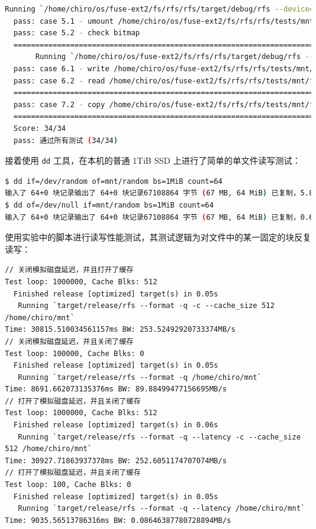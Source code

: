 \begin{lstlisting}[language=bash]
       Running `/home/chiro/os/fuse-ext2/fs/rfs/rfs/target/debug/rfs --device=/home/chiro/ddriver -q /home/chiro/os/fuse-ext2/fs/rfs/rfs/tests/mnt`
  pass: case 5.1 - umount /home/chiro/os/fuse-ext2/fs/rfs/rfs/tests/mnt
  pass: case 5.2 - check bitmap
  ============================================================================================================================    Finished dev [unoptimized + debuginfo] target(s) in 0.06s
       Running `/home/chiro/os/fuse-ext2/fs/rfs/rfs/target/debug/rfs --device=/home/chiro/ddriver -q /home/chiro/os/fuse-ext2/fs/rfs/rfs/tests/mnt`
  pass: case 6.1 - write /home/chiro/os/fuse-ext2/fs/rfs/rfs/tests/mnt/file0
  pass: case 6.2 - read /home/chiro/os/fuse-ext2/fs/rfs/rfs/tests/mnt/file0
  ============================================================================================================================pass: case 7.1 - prepare content of /home/chiro/os/fuse-ext2/fs/rfs/rfs/tests/mnt/file9
  pass: case 7.2 - copy /home/chiro/os/fuse-ext2/fs/rfs/rfs/tests/mnt/file9 to /home/chiro/os/fuse-ext2/fs/rfs/rfs/tests/mnt/file10
  ============================================================================================================================ 
  Score: 34/34
  pass: 通过所有测试 (34/34)
\end{lstlisting}

接着使用 \verb|dd| 工具，在本机的普通 1TiB SSD 上进行了简单的单文件读写测试：

\begin{lstlisting}[language=bash]
$ dd if=/dev/random of=mnt/random bs=1MiB count=64
输入了 64+0 块记录输出了 64+0 块记录67108864 字节 (67 MB, 64 MiB) 已复制，5.88972 s，11.4 MB/s
$ dd of=/dev/null if=mnt/random bs=1MiB count=64
输入了 64+0 块记录输出了 64+0 块记录67108864 字节 (67 MB, 64 MiB) 已复制，0.635838 s，106 MB/s
\end{lstlisting}

使用实验中的脚本进行读写性能测试，其测试逻辑为对文件中的某一固定的块反复读写：

\begin{lstlisting}
// 关闭模拟磁盘延迟，并且打开了缓存
Test loop: 1000000, Cache Blks: 512
  Finished release [optimized] target(s) in 0.05s
   Running `target/release/rfs --format -q -c --cache_size 512 /home/chiro/mnt`
Time: 30815.510034561157ms BW: 253.52492920733374MB/s
// 关闭模拟磁盘延迟，并且关闭了缓存
Test loop: 100000, Cache Blks: 0
  Finished release [optimized] target(s) in 0.05s
   Running `target/release/rfs --format -q /home/chiro/mnt`
Time: 8691.662073135376ms BW: 89.88499477156695MB/s
// 打开了模拟磁盘延迟，并且关闭了缓存
Test loop: 1000000, Cache Blks: 512
  Finished release [optimized] target(s) in 0.06s
   Running `target/release/rfs --format -q --latency -c --cache_size 512 /home/chiro/mnt`
Time: 30927.71863937378ms BW: 252.6051174707074MB/s
// 打开了模拟磁盘延迟，并且关闭了缓存
Test loop: 100, Cache Blks: 0
  Finished release [optimized] target(s) in 0.05s
   Running `target/release/rfs --format -q --latency /home/chiro/mnt`
Time: 9035.56513786316ms BW: 0.08646387780728894MB/s
\end{lstlisting}

